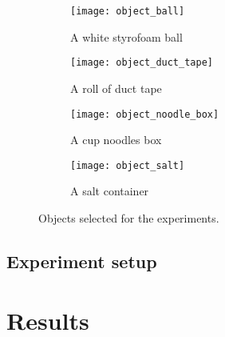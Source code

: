 \begin{figure}[htb]
    \centering
    \small
    \begin{subfigure}[b]{0.45\textwidth}
        \texttt{[image: object\_ball]}
        \caption{A white styrofoam ball}
        \label{fig:object_ball}
    \end{subfigure}
    \hfill  %
    \begin{subfigure}[b]{0.45\textwidth}
        \texttt{[image: object\_duct\_tape]}
        \caption{A roll of duct tape}
        \label{fig:object_duct_tape}
    \end{subfigure}

    \begin{subfigure}[b]{0.45\textwidth}
        \texttt{[image: object\_noodle\_box]}
        \caption{A cup noodles box}
        \label{fig:object_noodle_box}
    \end{subfigure}
    \hfill
    \begin{subfigure}[b]{0.45\textwidth}
    \texttt{[image: object\_salt]}
    \caption{A salt container}
    \label{fig:object_salt}
    \end{subfigure}
    \caption{Objects selected for the experiments.}\label{fig:objects}
\end{figure}

\subsection{Experiment setup}


\section{Results}

